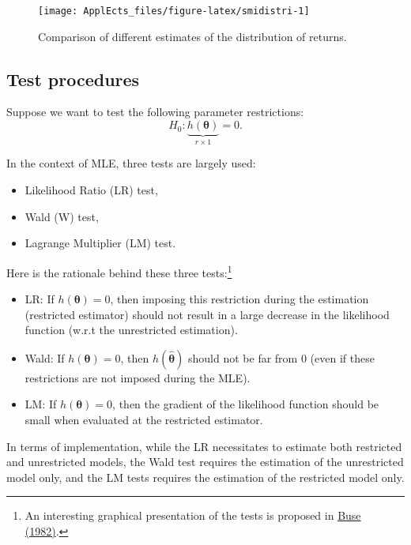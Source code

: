 \documentclass[
  12pt,
]{book}
\providecommand{\tightlist}{%
  \setlength{\itemsep}{0pt}\setlength{\parskip}{0pt}}
\theoremstyle{definition}
\theoremstyle{definition}
\theoremstyle{definition}
\theoremstyle{definition}
\theoremstyle{remark}
\begin{document}
\begin{figure}
\texttt{[image: ApplEcts\_files/figure-latex/smidistri-1]} \caption{Comparison of different estimates of the distribution of returns.}\label{fig:smidistri}
\end{figure}

\hypertarget{TestMLE}{%
\subsection{Test procedures}\label{TestMLE}}

Suppose we want to test the following parameter restrictions:
\begin{equation}
\boxed{H_0: \underbrace{h(\boldsymbol\theta)}_{r \times 1}=0.}
\end{equation}

In the context of MLE, three tests are largely used:

\begin{itemize}
\tightlist
\item
  Likelihood Ratio (LR) test,
\item
  Wald (W) test,
\item
  Lagrange Multiplier (LM) test.
\end{itemize}

Here is the rationale behind these three tests:\footnote{An interesting graphical presentation of the tests is proposed in \href{http://hedibert.org/wp-content/uploads/2014/04/LR-W-LM-Tests-Buse1982.pdf}{Buse (1982)}.}

\begin{itemize}
\tightlist
\item
  LR: If \(h(\boldsymbol\theta)=0\), then imposing this restriction during the estimation (restricted estimator) should not result in a large decrease in the likelihood function (w.r.t the unrestricted estimation).
\item
  Wald: If \(h(\boldsymbol\theta)=0\), then \(h(\hat{\boldsymbol\theta})\) should not be far from \(0\) (even if these restrictions are not imposed during the MLE).
\item
  LM: If \(h(\boldsymbol\theta)=0\), then the gradient of the likelihood function should be small when evaluated at the restricted estimator.
\end{itemize}

In terms of implementation, while the LR necessitates to estimate both restricted and unrestricted models, the Wald test requires the estimation of the unrestricted model only, and the LM tests requires the estimation of the restricted model only.
\end{document}

